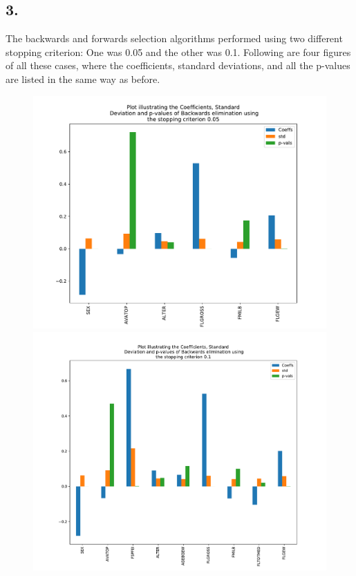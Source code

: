 \documentclass[]{article}
\begin{document}
\subsection*{3.}
The backwards and forwards selection algorithms performed using two different stopping criterion: One was 0.05 and the other was 0.1. Following are four figures of all these cases, where the coefficients, standard deviations, and all the p-values are listed in the same way as before.
\begin{figure}[H] 
	\label{ fig7} 
	\begin{minipage}[H]{0.5\linewidth}
		\centering
		\includegraphics[width=1.11\linewidth]{figures/BS_005.pdf}
		\vspace{4ex}
	\end{minipage}%
	\begin{minipage}[H]{0.5\linewidth}
		\centering
		\includegraphics[width=1.11\linewidth]{figures/BS_01.pdf}

\end{minipage}
\end{figure}
\end{document}
